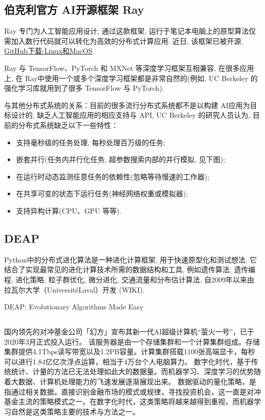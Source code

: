 \subsection{伯克利官方 AI开源框架 Ray}
Ray 专门为人工智能应用设计, 通过这款框架, 运行于笔记本电脑上的原型算法仅需加入数行代码就可以转化为高效的分布式计算应用. 近日, 该框架已被开源, \href{https://github.com/ray-project/ray}{GitHub下载-Linux和MacOS}.

Ray 与 TensorFlow、PyTorch 和 MXNet 等深度学习框架互相兼容, 在很多应用上, 在 Ray中使用一个或多个深度学习框架都是非常自然的(例如, UC Berkeley 的强化学习库就用到了很多 TensorFlow 与 PyTorch).

与其他分布式系统的关系：目前的很多流行分布式系统都不是以构建 AI应用为目标设计的, 缺乏人工智能应用的相应支持与 API, UC Berkeley 的研究人员认为, 目前的分布式系统缺乏以下一些特性：

\begin{itemize}
\item 支持毫秒级的任务处理, 每秒处理百万级的任务;
\item 嵌套并行(任务内并行化任务, 超参数搜索内部的并行模拟, 见下图);
\item 在运行时动态监测任意任务的依赖性(忽略等待慢速的工作器);
\item 在共享可变的状态下运行任务(神经网络权重或模拟器);
\item 支持异构计算(CPU、GPU 等等).
\end{itemize}
\subsection{DEAP}

Python中的分布式进化算法是一种进化计算框架, 用于快速原型化和测试想法. 它结合了实现最常见的进化计算技术所需的数据结构和工具, 例如遗传算法, 遗传编程, 进化策略, 粒子群优化, 微分进化, 交通流量和分布估计算法. 自2009年以来由拉瓦尔大学（UniversitéLaval）开发 (WIKI).

{DEAP}: Evolutionary Algorithms Made Easy \cite{DEAPJMLR2012}
\subsection{}
国内领先的对冲基金公司「幻方」宣布其新一代AI超级计算机“萤火一号”，已于2020年3月正式投入运行。
该服务器是由一个存储集群和一个计算集群组成。存储集群提供4.1Tbps读写带宽以及1.2PB容量。计算集群搭载1100张高端显卡，每秒可以进行1.84亿亿次浮点运算，相当于4万台个人电脑算力。
数字化时代，基于传统统计、计量的方法已无法处理如此大的数据量。而机器学习、深度学习的优势随着大数据、计算机处理能力的飞速发展逐渐展现出来。
数据驱动的量化策略，是指通过相关数据，直接识别金融市场的模式或规律，寻找投资机会，这一直是对冲基金主流的策略模式之一。在数字化时代，这类策略将越来越得到重视，而机器学习自然是这类策略主要的技术与方法之一。
